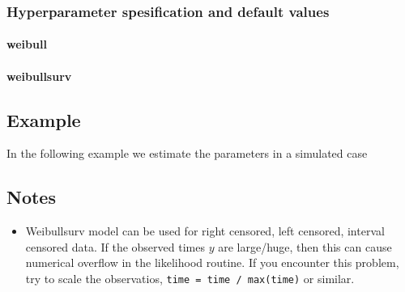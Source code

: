\documentclass[a4paper,11pt]{article}
\begin{document}
\subsubsection*{Hyperparameter spesification and default values}
\paragraph{weibull}
\begin{quote}
    
\end{quote}
\paragraph{weibullsurv}
\begin{quote}
    
\end{quote}

\subsection*{Example}

In the following example we estimate the parameters in a simulated
case 

\subsection*{Notes}

\begin{itemize}
\item Weibullsurv model can be used for right censored, left censored,
    interval censored data. If the observed times $y$ are large/huge,
    then this can cause numerical overflow in the likelihood routine.
    If you encounter this problem, try to scale the observatios,
    \verb|time = time / max(time)| or similar.
\end{itemize}
\end{document}
